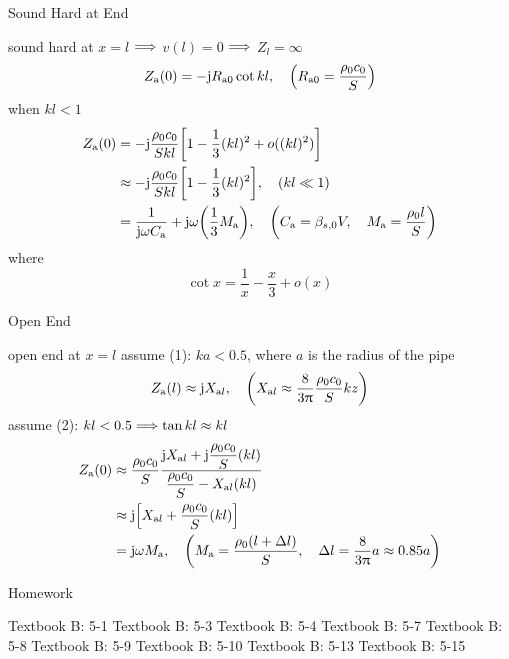 \documentclass[9pt,mathserif]{beamer}
\begin{document}
\begin{frame}{Sound Hard at End}
	\begin{outline}
		\1 sound hard at $x=l$ $\Longrightarrow$ $v(l) =0$ $\Longrightarrow$ $Z_l =\infty$
		$$
		Z\st{a}(0) = -\mj R\st{a0}\cot kl\qc \qty(R\st{a0}=\frac{\rho_0c_0}{
		S})$$
		\1 when $kl<1$
		\begin{align*}
			Z\st{a}(0) &= -\mj \frac{\rho_0c_0}{Skl} \qty[1-
			\frac13 (kl)^2+o((kl)^2)]\\
			&\approx -\mj \frac{\rho_0c_0}{Skl} \qty[1-\frac13
			(kl)^2]\qc (kl\ll 1)\\
			&= \frac{1}{\mj \omega C\st{a}}+\mj \omega\qty(\frac13 M\st{a})
			\qc \qty(C\st{a} = \beta_{s,0} V\qc M\st{a}=\frac{\rho_0 l}{S})
		\end{align*}
		\1 where
		$$
		\cot x = \frac1x - \frac{x}{3} + o(x)
		$$
	\end{outline}
\end{frame}

\begin{frame}{Open End}
	\begin{outline}
		\1 open end at $x=l$
		\1 assume (1): $ka<0.5$, where $a$ is the radius of
		the pipe
		$$Z\st{a}(l) \approx \mj X_{\mathrm{a}l}\qc
		\qty(X_{\mathrm{a}l} \approx \frac{8}{3\uppi} \frac{\rho_0c_0}{S}
		kz)$$
		\1 assume (2): $kl<0.5 \Longrightarrow \tan kl \approx kl$
		\begin{align*}
		Z\st{a}(0) &\approx \frac{\rho_0c_0}{S} \frac{
			\mj X_{\mathrm{a}l}+\mj \dfrac{\rho_0c_0}{S} (kl)}{
				\dfrac{\rho_0c_0}{S}-X_{\mathrm{a}l} (kl)}\\
				&\approx \mj  \qty[X_{\mathrm{a}l} + \dfrac{\rho_0
				c_0}{S} (kl)]\\
				& = \mj \omega M\st{a} \qc \qty(
				M\st{a} = \frac{\rho_0(l+\Delta l)}{S}\qc
				\Delta l=\frac{8}{3\uppi}a \approx 0.85 a)
		\end{align*}
	\end{outline}
\end{frame}

\begin{frame}{Homework}
	\begin{outline}[enumerate]
		\1 Textbook B: 5-1
		\1 Textbook B: 5-3
		\1 Textbook B: 5-4
		\1 Textbook B: 5-7
		\1 Textbook B: 5-8
		\1 Textbook B: 5-9
		\1 Textbook B: 5-10
		\1 Textbook B: 5-13
		\1 Textbook B: 5-15
	\end{outline}
\end{frame}

\setcounter{framenumber}{0}
\renewcommand{\titlestring}{Radiation of Sound}
\end{document}
